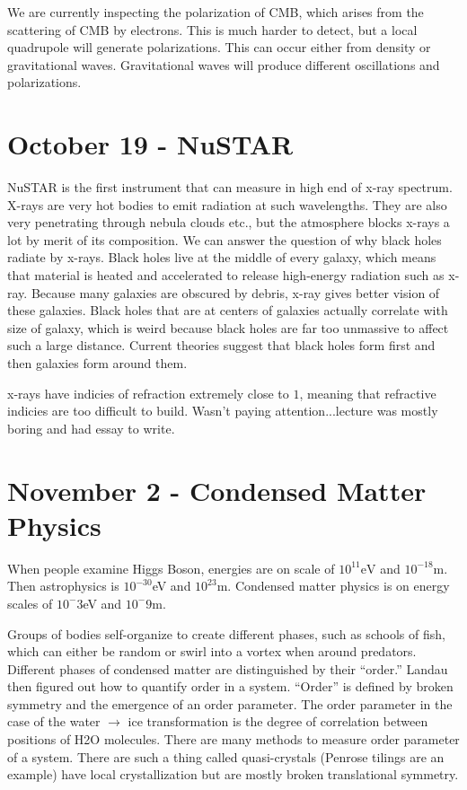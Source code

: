 \documentclass{report}
\begin{document}
We are currently inspecting the polarization of CMB, which arises from the scattering of CMB by electrons. This is much harder to detect, but a local quadrupole will generate polarizations. This can occur either from density or gravitational waves. Gravitational waves will produce different oscillations and polarizations. 

\section{October 19 - NuSTAR}

NuSTAR is the first instrument that can measure in high end of x-ray spectrum. X-rays are very hot bodies to emit radiation at such wavelengths. They are also very penetrating through nebula clouds etc., but the atmosphere blocks x-rays a lot by merit of its composition. We can answer the question of why black holes radiate by x-rays. Black holes live at the middle of every galaxy, which means that material is heated and accelerated to release high-energy radiation such as x-ray. Because many galaxies are obscured by debris, x-ray gives better vision of these galaxies. Black holes that are at centers of galaxies actually correlate with size of galaxy, which is weird because black holes are far too unmassive to affect such a large distance. Current theories suggest that black holes form first and then galaxies form around them. 

x-rays have indicies of refraction extremely close to $1$, meaning that refractive indicies are too difficult to build. Wasn't paying attention...lecture was mostly boring and had essay to write.


\section{November 2 - Condensed Matter Physics}
When people examine Higgs Boson, energies are on scale of $10^{11}\mathrm{eV}$ and $10^{-18}$m. Then astrophysics is $10^{-30}$eV and $10^{23}$m. Condensed matter physics is on energy scales of $10^-3$eV and $10^-9$m.

Groups of bodies self-organize to create different phases, such as schools of fish, which can either be random or swirl into a vortex when around predators. Different phases of condensed matter are distinguished by their ``order.'' Landau then figured out how to quantify order in a system. ``Order'' is defined by broken symmetry and the emergence of an order parameter. The order parameter in the case of the water $\to$ ice transformation is the degree of correlation between positions of H2O molecules. There are many methods to measure order parameter of a system. There are such a thing called quasi-crystals (Penrose tilings are an example) have local crystallization but are mostly broken translational symmetry. 
\end{document}
